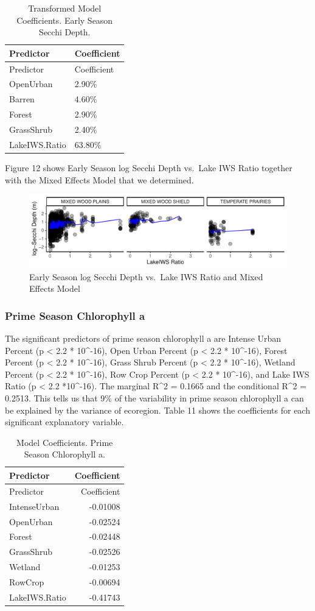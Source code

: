 \documentclass[12pt,]{article}
\begin{document}
\begin{longtable}[]{@{}ll@{}}
\caption{Transformed Model Coefficients. Early Season Secchi
Depth.}\tabularnewline
\toprule
Predictor & Coefficient\tabularnewline
\midrule
\endfirsthead
\toprule
Predictor & Coefficient\tabularnewline
\midrule
\endhead
OpenUrban & 2.90\%\tabularnewline
Barren & 4.60\%\tabularnewline
Forest & 2.90\%\tabularnewline
GrassShrub & 2.40\%\tabularnewline
LakeIWS.Ratio & 63.80\%\tabularnewline
\bottomrule
\end{longtable}

Figure 12 shows Early Season log Secchi Depth vs.~Lake IWS Ratio
together with the Mixed Effects Model that we determined.

\begin{figure}
\centering
\includegraphics{Bollt_Greif_Raby_Roth_Project_Final_files/figure-latex/unnamed-chunk-23-1.pdf}
\caption{Early Season log Secchi Depth vs.~Lake IWS Ratio and Mixed
Effects Model}
\end{figure}

\hypertarget{prime-season-chlorophyll-a}{%
\subsubsection{Prime Season Chlorophyll
a}\label{prime-season-chlorophyll-a}}

The significant predictors of prime season chlorophyll a are Intense
Urban Percent (p \textless{} 2.2 * 10\^{}-16), Open Urban Percent (p
\textless{} 2.2 * 10\^{}-16), Forest Percent (p \textless{} 2.2 *
10\^{}-16), Grass Shrub Percent (p \textless{} 2.2 * 10\^{}-16), Wetland
Percent (p \textless{} 2.2 * 10\^{}-16), Row Crop Percent (p \textless{}
2.2 * 10\^{}-16), and Lake IWS Ratio (p \textless{} 2.2 *10\^{}-16). The
marginal R\^{}2 = 0.1665 and the conditional R\^{}2 = 0.2513. This tells
us that 9\% of the variability in prime season chlorophyll a can be
explained by the variance of ecoregion. Table 11 shows the coefficients
for each significant explanatory variable.

\begin{longtable}[]{@{}lr@{}}
\caption{Model Coefficients. Prime Season Chlorophyll a.}\tabularnewline
\toprule
Predictor & Coefficient\tabularnewline
\midrule
\endfirsthead
\toprule
Predictor & Coefficient\tabularnewline
\midrule
\endhead
IntenseUrban & -0.01008\tabularnewline
OpenUrban & -0.02524\tabularnewline
Forest & -0.02448\tabularnewline
GrassShrub & -0.02526\tabularnewline
Wetland & -0.01253\tabularnewline
RowCrop & -0.00694\tabularnewline
LakeIWS.Ratio & -0.41743\tabularnewline
\bottomrule
\end{longtable}
\end{document}
